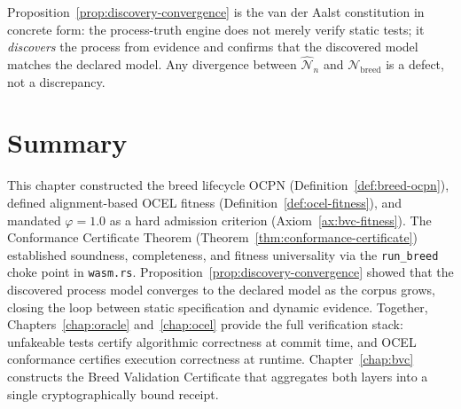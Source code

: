 Proposition~\ref{prop:discovery-convergence} is the van der Aalst
constitution in concrete form: the process-truth engine does not merely
verify static tests; it \emph{discovers} the process from evidence and
confirms that the discovered model matches the declared model.  Any
divergence between $\hat{\mathcal{N}}_n$ and $\mathcal{N}_{\mathrm{breed}}$
is a defect, not a discrepancy.

\section{Summary}
\label{sec:ocel-summary}

This chapter constructed the breed lifecycle OCPN
(Definition~\ref{def:breed-ocpn}), defined alignment-based OCEL fitness
(Definition~\ref{def:ocel-fitness}), and mandated $\varphi = 1.0$ as a
hard admission criterion (Axiom~\ref{ax:bvc-fitness}).  The Conformance
Certificate Theorem (Theorem~\ref{thm:conformance-certificate}) established
soundness, completeness, and fitness universality via the
\texttt{run\_breed} choke point in \texttt{wasm.rs}.  Proposition~\ref{prop:discovery-convergence}
showed that the discovered process model converges to the declared model as
the corpus grows, closing the loop between static specification and dynamic
evidence.  Together, Chapters~\ref{chap:oracle} and~\ref{chap:ocel}
provide the full verification stack: unfakeable tests certify algorithmic
correctness at commit time, and OCEL conformance certifies execution
correctness at runtime.  Chapter~\ref{chap:bvc} constructs the Breed
Validation Certificate that aggregates both layers into a single
cryptographically bound receipt.
